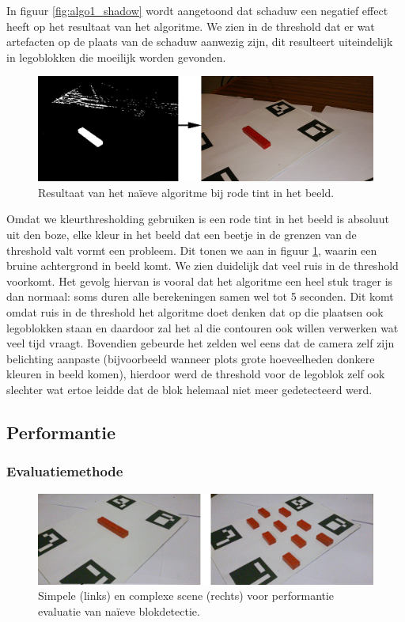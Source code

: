 In figuur \ref{fig:algo1_shadow} wordt aangetoond dat schaduw een negatief effect heeft op het resultaat van het algoritme. We zien in de threshold dat er wat artefacten op de plaats van de schaduw aanwezig zijn, dit resulteert uiteindelijk in legoblokken die moeilijk worden gevonden.

\begin{figure}
  \centering
  \includegraphics[width=\linewidth]{img/alg1NonWhiteBg}
  \caption{Resultaat van het na\"ieve algoritme bij rode tint in het beeld.}
  \label{fig:algo1_nonwhitebg}
\end{figure}

Omdat we kleurthresholding gebruiken is een rode tint in het beeld is absoluut uit den boze, elke kleur in het beeld dat een beetje in de grenzen van de threshold valt vormt een probleem. Dit tonen we aan in figuur \ref{fig:algo1_nonwhitebg}, waarin een bruine achtergrond in beeld komt. We zien duidelijk dat veel ruis in de threshold voorkomt. Het gevolg hiervan is vooral dat het algoritme een heel stuk trager is dan normaal: soms duren alle berekeningen samen wel tot 5 seconden. Dit komt omdat ruis in de threshold het algoritme doet denken dat op die plaatsen ook legoblokken staan en daardoor zal het al die contouren ook willen verwerken wat veel tijd vraagt. Bovendien gebeurde het zelden wel eens dat de camera zelf zijn belichting aanpaste (bijvoorbeeld wanneer plots grote hoeveelheden donkere kleuren in beeld komen), hierdoor werd de threshold voor de legoblok zelf ook slechter wat ertoe leidde dat de blok helemaal niet meer gedetecteerd werd.

\subsection{Performantie}

\subsubsection*{Evaluatiemethode}

\begin{figure}
  \centering
  \includegraphics[width=\linewidth]{img/simpleComplex}
  \caption{Simpele (links) en complexe scene (rechts) voor performantie evaluatie van na\"ieve blokdetectie.}
  \label{fig:simple_complex}
\end{figure}

